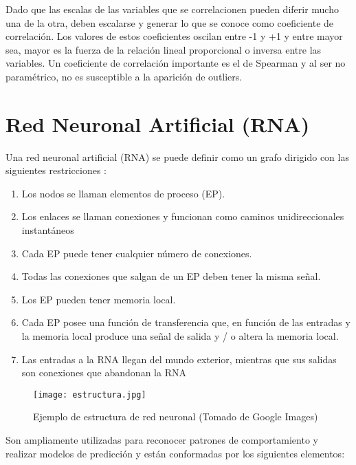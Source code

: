 Dado que las escalas de las variables que se correlacionen pueden diferir mucho una de la otra, deben escalarse y generar lo que se conoce como coeficiente de correlación. Los valores de estos coeficientes oscilan entre -1 y +1 y entre mayor sea, mayor es la fuerza de la relación lineal proporcional o inversa entre las variables. Un coeficiente de correlación importante es el de Spearman y al ser no paramétrico, no es susceptible a la aparición de outliers.

\section{Red Neuronal Artificial (RNA)}

   Una red neuronal artificial (RNA) se puede definir como un grafo dirigido con las siguientes restricciones \citep{HECHT-NIELSEN1992}:

\begin{enumerate}
	\item Los nodos se llaman elementos de proceso (EP).
	\item Los enlaces se llaman conexiones y funcionan como caminos unidireccionales instantáneos
	\item Cada EP puede tener cualquier número de conexiones.
	\item Todas las conexiones que salgan de un EP deben tener la misma señal.
	\item Los EP pueden tener memoria local.
	\item Cada EP posee una función de transferencia que, en función de las entradas y la memoria local produce una señal de salida y / o altera la memoria local.
	\item Las entradas a la RNA llegan del mundo exterior, mientras que sus salidas son conexiones que abandonan la RNA
\end{enumerate}

\begin{figure}[H]
	\centering
	\texttt{[image: estructura.jpg]}
	\caption{Ejemplo de estructura de red neuronal (Tomado de Google Images)}
	\label{fig:e_red}
\end{figure}

Son ampliamente utilizadas para reconocer patrones de comportamiento y realizar modelos de predicción y están conformadas por los siguientes elementos:

